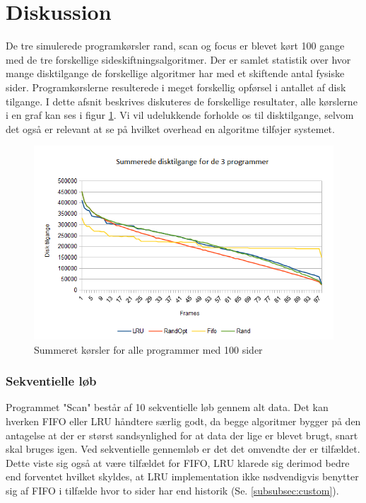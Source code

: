 \section{Diskussion}
De tre simulerede programkørsler rand, scan og focus er blevet kørt 100 gange med de tre forskellige sideskiftningsalgoritmer. Der er samlet statistik over hvor mange disktilgange de forskellige algoritmer har med et skiftende antal fysiske sider. Programkørslerne resulterede i meget forskellig opførsel i antallet af disk tilgange. I dette afsnit beskrives diskuteres de forskellige resultater, alle kørslerne i en graf kan ses i figur \ref{fig:all}. Vi vil udelukkende forholde os til disktilgange, selvom det også er relevant at se på hvilket overhead en algoritme tilføjer systemet.


\begin{figure}[ht]
\centerline{\includegraphics[scale=1]{graph/stat_all}}
\FloatBarrier
\caption{Summeret kørsler for alle programmer med 100 sider}
\label{fig:all}
\end{figure}

\subsubsection{Sekventielle løb}
Programmet "Scan" består af 10 sekventielle løb gennem alt data. Det kan hverken FIFO eller LRU håndtere særlig godt, da begge algoritmer bygger på den antagelse at der er størst sandsynlighed for at data der lige er blevet brugt, snart skal bruges igen. Ved sekventielle gennemløb er det det omvendte der er tilfældet. Dette viste sig også at være tilfældet for FIFO, LRU klarede sig derimod bedre end forventet hvilket skyldes, at LRU implementation ikke nødvendigvis benytter sig af FIFO i tilfælde hvor to sider har end historik (Se. \ref{subsubsec:custom}).

